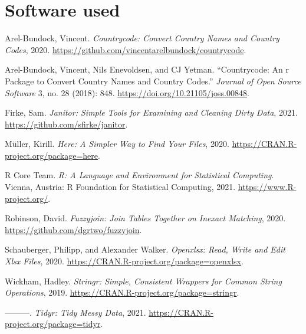\documentclass[
  12pt,
]{article}
\newlength{\cslhangindent}
\newenvironment{CSLReferences}[2] %
 {%
  \setlength{\parindent}{0pt}
  \ifodd #1 \everypar{\setlength{\hangindent}{\cslhangindent}}\ignorespaces\fi
  \ifnum #2 > 0
  \setlength{\parskip}{#2\baselineskip}
  \fi
 }%
 {}
\begin{document}
\hypertarget{software-used}{%
\section*{Software used}\label{software-used}}

\hypertarget{refs}{}
\begin{CSLReferences}{1}{0}
\leavevmode{}%
Arel-Bundock, Vincent. \emph{Countrycode: Convert Country Names and
Country Codes}, 2020.
\url{https://github.com/vincentarelbundock/countrycode}.

\leavevmode{}%
Arel-Bundock, Vincent, Nils Enevoldsen, and CJ Yetman. {``Countrycode:
An r Package to Convert Country Names and Country Codes.''}
\emph{Journal of Open Source Software} 3, no. 28 (2018): 848.
\url{https://doi.org/10.21105/joss.00848}.

\leavevmode{}%
Firke, Sam. \emph{Janitor: Simple Tools for Examining and Cleaning Dirty
Data}, 2021. \url{https://github.com/sfirke/janitor}.

\leavevmode{}%
Müller, Kirill. \emph{Here: A Simpler Way to Find Your Files}, 2020.
\url{https://CRAN.R-project.org/package=here}.

\leavevmode{}%
R Core Team. \emph{R: A Language and Environment for Statistical
Computing}. Vienna, Austria: R Foundation for Statistical Computing,
2021. \url{https://www.R-project.org/}.

\leavevmode{}%
Robinson, David. \emph{Fuzzyjoin: Join Tables Together on Inexact
Matching}, 2020. \url{https://github.com/dgrtwo/fuzzyjoin}.

\leavevmode{}%
Schauberger, Philipp, and Alexander Walker. \emph{Openxlsx: Read, Write
and Edit Xlsx Files}, 2020.
\url{https://CRAN.R-project.org/package=openxlsx}.

\leavevmode{}%
Wickham, Hadley. \emph{Stringr: Simple, Consistent Wrappers for Common
String Operations}, 2019.
\url{https://CRAN.R-project.org/package=stringr}.

\leavevmode{}%
---------. \emph{Tidyr: Tidy Messy Data}, 2021.
\url{https://CRAN.R-project.org/package=tidyr}.


\end{CSLReferences}
\end{document}
